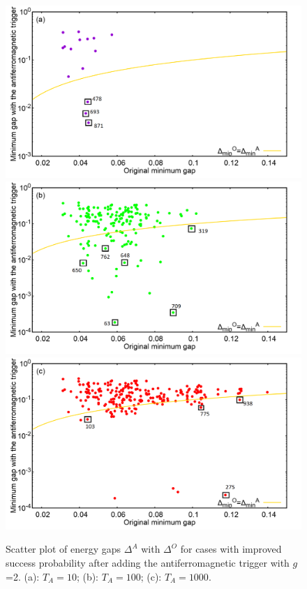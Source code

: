 \documentclass[../main.tex]{subfiles}
\begin{document}
\begin{figure}
\centering 
\includegraphics[scale=0.33]{selected_T10_g2.png}
\includegraphics[scale=0.33]{selected_T100_g2.png}
\includegraphics[scale=0.33]{selected_T1000_g2.png}
\caption{Scatter plot of energy gaps $\Delta^A $ with $\Delta^O$ for cases with improved success probability after adding the antiferromagnetic trigger with $g$=2. (a): $T_A=10$; (b): $T_A=100$; (c): $T_A=1000$.}
\label{fig:a41}
\end{figure}
\end{document}
